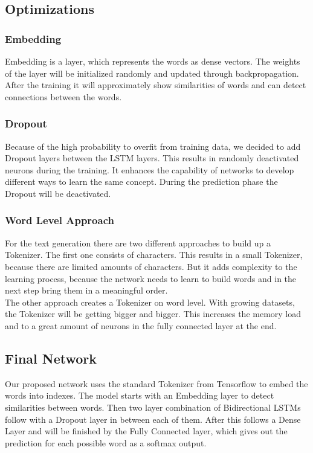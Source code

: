 \documentclass[conference]{IEEEtran}
\begin{document}
\subsection{Optimizations}

\subsubsection{Embedding}

Embedding is a layer, which represents the words as dense vectors. The weights of the layer will be initialized randomly and updated through backpropagation. After the training it will approximately show similarities of words and can detect connections between the words.

\subsubsection{Dropout}

Because of the high probability to overfit from training data, we decided to add Dropout layers between the LSTM layers. This results in randomly deactivated neurons during the training. It enhances the capability of networks to develop different ways to learn the same concept. During the prediction phase the Dropout will be deactivated.

\subsubsection{Word Level Approach}

For the text generation there are two different approaches to build up a Tokenizer. The first one consists of characters. This results in a small Tokenizer, because there are limited amounts of characters. But it adds complexity to the learning process, because the network needs to learn to build words and in the next step bring them in a meaningful order.\\
The other approach creates a Tokenizer on word level. With growing datasets, the Tokenizer will be getting bigger and bigger. This increases the memory load and to a great amount of neurons in the fully connected layer at the end.

\subsection{Final Network}

Our proposed network uses the standard Tokenizer from Tensorflow to embed the words into indexes. The model starts with an Embedding layer to detect similarities between words. Then two layer combination of Bidirectional LSTMs follow with a Dropout layer in between each of them. After this follows a Dense Layer and will be finished by the Fully Connected layer, which gives out the prediction for each possible word as a softmax output.
\end{document}
